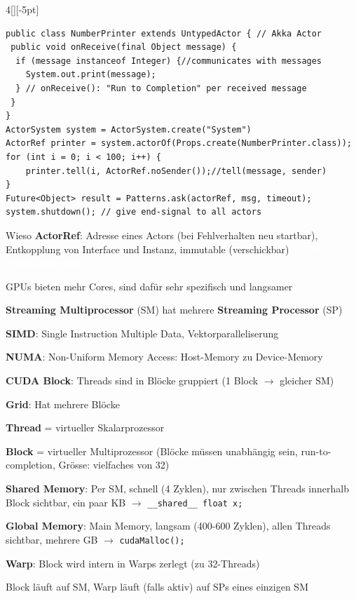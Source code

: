 \documentclass[%
	pdftex,%
	a4paper,%
	landscape,%
	ngerman,
	oneside,%
	6pt,%
	halfparskip,%
]{scrbook}
\newenvironment{mainbox}{%
  \def\FrameCommand{\fboxrule 1px \fcolorbox{black}{spec_blue}}%
  \MakeFramed {\advance\hsize-\width \FrameRestore}}%
 {\endMakeFramed}
\newcommand{\maintopic}[1]{\setcounter{subtopicenum}{0}\setcounter{subsubtopicenum}{0}\vspace{-4px}\begin{mainbox}\textcolor{white}{\textbf{\large{\stepcounter{maintopicenum}\Roman{maintopicenum}. #1}}}\end{mainbox}\vspace{-4px}}
\newenvironment{tight-itemize}
{ \begin{itemize}[leftmargin=*, nosep]
    \setlength{\itemsep}{0px}
    \setlength{\parskip}{0px}
    \setlength{\parsep}{0px}  }
{ \end{itemize}                  }
\begin{document}
\begin{multicols}{4}[][-5pt]
\begin{tight-itemize}
\end{tight-itemize}
\begin{lstlisting}
public class NumberPrinter extends UntypedActor { // Akka Actor
 public void onReceive(final Object message) {
  if (message instanceof Integer) {//communicates with messages
    System.out.print(message);
  } // onReceive(): "Run to Completion" per received message
 }
}
ActorSystem system = ActorSystem.create("System")
ActorRef printer = system.actorOf(Props.create(NumberPrinter.class));
for (int i = 0; i < 100; i++) {
    printer.tell(i, ActorRef.noSender());//tell(message, sender)
}
Future<Object> result = Patterns.ask(actorRef, msg, timeout);
system.shutdown(); // give end-signal to all actors
\end{lstlisting}
Wieso \textbf{ActorRef}: Adresse eines Actors (bei Fehlverhalten neu startbar), Entkopplung von Interface und Instanz, immutable (verschickbar)
\maintopic{GPU Parallelisierung}
\begin{tight-itemize}
	\item{GPUs bieten mehr Cores, sind dafür sehr spezifisch und langsamer}
	\item{\textbf{Streaming Multiprocessor} (SM) hat mehrere \textbf{Streaming Processor} (SP)}
  	\item{\textbf{SIMD}: Single Instruction Multiple Data, Vektorparalleliserung}
    \item{\textbf{NUMA}: Non-Uniform Memory Access: Host-Memory zu Device-Memory}
    \item{\textbf{CUDA Block}: Threads sind in Blöcke gruppiert (1 Block $\rightarrow$ gleicher SM)}
    \item{\textbf{Grid}: Hat mehrere Blöcke}
    \item{\textbf{Thread} = virtueller Skalarprozessor}
    \item{\textbf{Block} = virtueller Multiprozessor (Blöcke müssen unabhängig sein, run-to-completion, Grösse: vielfaches von 32)}
    \item{\textbf{Shared Memory}: Per SM, schnell (4 Zyklen), nur zwischen Threads innerhalb Block sichtbar, ein paar KB $\rightarrow$ \lstinline|__shared__ float x;|}
    \item{\textbf{Global Memory}: Main Memory, langsam (400-600 Zyklen), allen Threads sichtbar, mehrere GB $\rightarrow$ \lstinline|cudaMalloc();|}
    \item{\textbf{Warp}: Block wird intern in Warps zerlegt (zu 32-Threads)}
    \item{Block läuft auf SM, Warp läuft (falls aktiv) auf SPs eines einzigen SM}

\end{tight-itemize}
\end{multicols}
\end{document}
